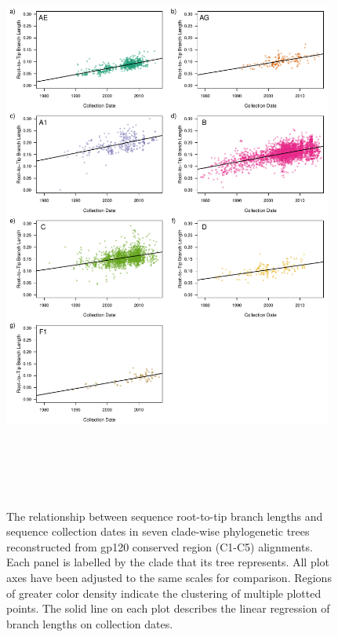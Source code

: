 \documentclass[12pt]{article}
\begin{document}
\begin{figure}
    \includegraphics[height=195mm, width=0.97\textwidth]{branch-lengths}
    \caption{%
    The relationship between sequence root-to-tip branch lengths and sequence collection dates in seven clade-wise phylogenetic trees reconstructed from gp120 conserved region (C1-C5) alignments.
    Each panel is labelled by the clade that its tree represents. 
    All plot axes have been adjusted to the same scales for comparison. 
    Regions of greater color density indicate the clustering of multiple plotted points.  
    The solid line on each plot describes the linear regression of branch lengths on collection dates. 
    }
	\centering
   
    \label{branch-lengths}
\end{figure}
\end{document}
